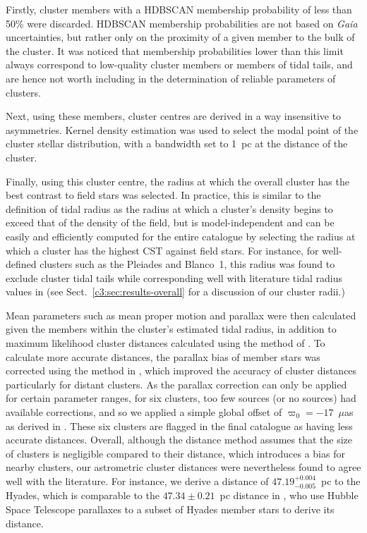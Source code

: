 Firstly, cluster members with a HDBSCAN membership probability of less than 50\% were discarded. HDBSCAN membership probabilities are not based on \emph{Gaia} uncertainties, but rather only on the proximity of a given member to the bulk of the cluster. It was noticed that membership probabilities lower than this limit always correspond to low-quality cluster members or members of tidal tails, and are hence not worth including in the determination of reliable parameters of clusters. 

Next, using these members, cluster centres are derived in a way insensitive to asymmetries. Kernel density estimation was used to select the modal point of the cluster stellar distribution, with a bandwidth set to 1~pc at the distance of the cluster. 

Finally, using this cluster centre, the radius at which the overall cluster has the best contrast to field stars was selected. In practice, this is similar to the \cite{king_structure_star_1962} definition of tidal radius as the radius at which a cluster's density begins to exceed that of the density of the field, but is model-independent and can be easily and efficiently computed for the entire catalogue by selecting the radius at which a cluster has the highest CST against field stars. For instance, for well-defined clusters such as the Pleiades and Blanco~1, this radius was found to exclude cluster tidal tails while corresponding well with literature tidal radius values in \cite{kharchenko_global_2013} (see Sect.~\ref{c3:sec:results-overall} for a discussion of our cluster radii.)

Mean parameters such as mean proper motion and parallax were then calculated given the members within the cluster's estimated tidal radius, in addition to maximum likelihood cluster distances calculated using the method of \cite{cantat-gaudin_characterising_2018}. To calculate more accurate distances, the parallax bias of member stars was corrected using the method in \cite{lindegren_gaia_2021}, which improved the accuracy of cluster distances particularly for distant clusters. As the \cite{lindegren_gaia_2021} parallax correction can only be applied for certain parameter ranges, for six clusters, too few sources (or no sources) had available corrections, and so we applied a simple global offset of $\varpi_0 = -17$~$\mu$as as derived in \cite{lindegren_gaia_2021}. These six clusters are flagged in the final catalogue as having less accurate distances. Overall, although the \cite{cantat-gaudin_characterising_2018} distance method assumes that the size of clusters is negligible compared to their distance, which introduces a bias for nearby clusters, our astrometric cluster distances were nevertheless found to agree well with the literature. For instance, we derive a distance of $47.19^{+0.004}_{-0.005}$~pc to the Hyades, which is comparable to the $47.34\pm0.21$~pc distance in \cite{mcarthur_astrometry_2011}, who use Hubble Space Telescope parallaxes to a subset of Hyades member stars to derive its distance.

